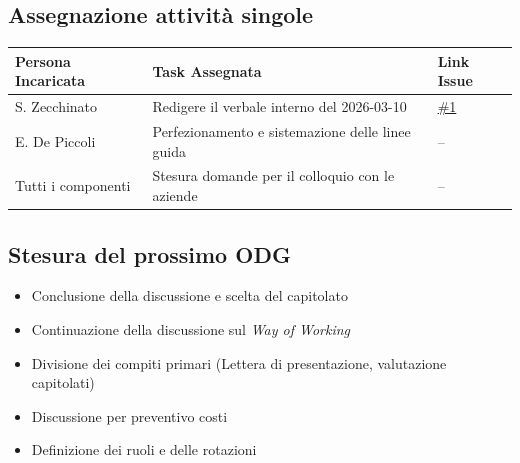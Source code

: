 \documentclass[a4paper, 10pt, colorlinks=true, linkcolor=black, urlcolor=blue, citecolor=blue, hidelinks]{article}
\newcommand{\issue}[1]{\href{https://github.com/thebitless-group-swe/thebitless.github.io/issues/#1}{\##1}}
\begin{document}
\subsection{Assegnazione attività singole}
\begin{center}
\renewcommand{\arraystretch}{1.4}
\begin{tabular}{|p{4.2cm}|p{6.2cm}|p{2.2cm}|}
\hline
\textbf{Persona Incaricata} & \textbf{Task Assegnata} & \centering\textbf{Link Issue} \tabularnewline
\hline
S. Zecchinato & Redigere il verbale interno del 2026-03-10 & \centering \issue{1} \tabularnewline
\hline
E. De Piccoli & Perfezionamento e sistemazione delle linee guida & \centering  -- \tabularnewline
\hline
Tutti i componenti & Stesura domande per il colloquio con le aziende & \centering -- \tabularnewline
\hline
\end{tabular}
\end{center}

\subsection{Stesura del prossimo ODG}
\begin{itemize}
    \item Conclusione della discussione e scelta del capitolato 
    \item Continuazione della discussione sul \textit{Way of Working}
    \item Divisione dei compiti primari (Lettera di presentazione, valutazione capitolati)
    \item Discussione per preventivo costi 
    \item Definizione dei ruoli e delle rotazioni
\end{itemize}

\appendix
\end{document}
